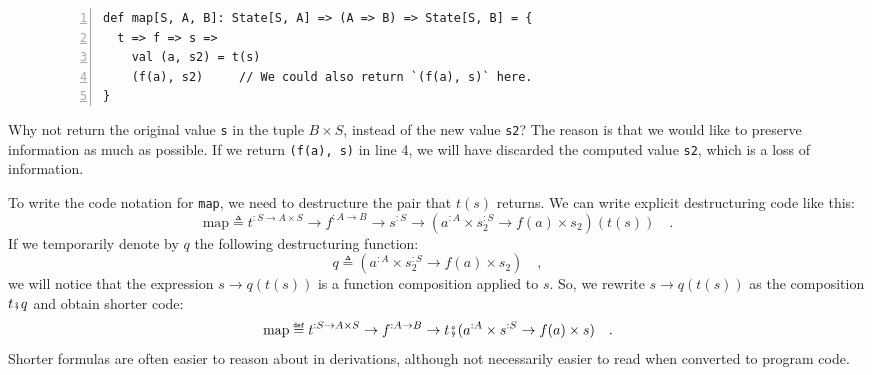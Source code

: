 \begin{wrapfigure}{l}{0.62\columnwidth}%
\vspace{-0\baselineskip}
\begin{lstlisting}[numbers=left]
def map[S, A, B]: State[S, A] => (A => B) => State[S, B] = {
  t => f => s =>
    val (a, s2) = t(s)
    (f(a), s2)     // We could also return `(f(a), s)` here.
}
\end{lstlisting}
\vspace{-1.25\baselineskip}
\end{wrapfigure}%

\noindent Why not return the original value \lstinline!s! in the
tuple $B\times S$, instead of the new value \lstinline!s2!? The
reason is that we would like to preserve information as much as possible.
If we return \lstinline!(f(a), s)! in line 4, we will have discarded
the computed value \lstinline!s2!, which is a loss of information.

To write the code notation for \lstinline!map!, we need to destructure
the pair that $t(s)$ returns. We can write explicit destructuring
code like this:
\[
\text{map}\triangleq t^{:S\rightarrow A\times S}\rightarrow f^{:A\rightarrow B}\rightarrow s^{:S}\rightarrow(a^{:A}\times s_{2}^{:S}\rightarrow f(a)\times s_{2})(t(s))\quad.
\]
If we temporarily denote by $q$ the following destructuring function:
\[
q\triangleq(a^{:A}\times s_{2}^{:S}\rightarrow f(a)\times s_{2})\quad,
\]
we will notice that the expression $s\rightarrow q(t(s))$ is a function
composition applied to $s$. So, we rewrite $s\rightarrow q(t(s))$
as the composition $t\bef q$ and obtain shorter code:
\[
\text{map}\triangleq t^{:S\rightarrow A\times S}\rightarrow f^{:A\rightarrow B}\rightarrow t\bef(a^{:A}\times s^{:S}\rightarrow f(a)\times s)\quad.
\]
Shorter formulas are often easier to reason about in derivations,
although not necessarily easier to read when converted to program
code.

